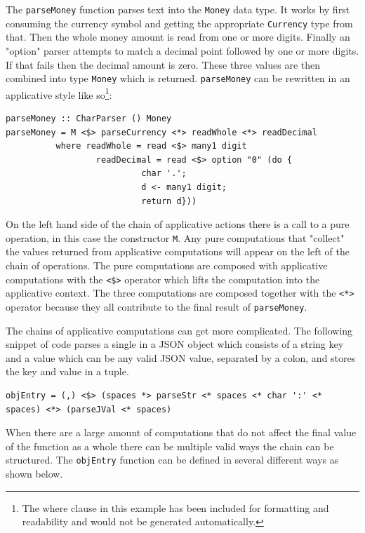 The \texttt{parseMoney} function parses text into the \texttt{Money} data type. It works by first consuming the currency symbol and getting the appropriate \texttt{Currency} type from that. Then the whole money amount is read from one or more digits. Finally an "option" parser attempts to match a decimal point followed by one or more digits. If that fails then the decimal amount is zero. These three values are then combined into type \texttt{Money} which is returned. \texttt{parseMoney} can be rewritten in an applicative style like so\footnote{The where clause in this example has been included for formatting and readability and would not be generated automatically.}:

\begin{lstlisting}[frame=tlrb]
parseMoney :: CharParser () Money
parseMoney = M <$> parseCurrency <*> readWhole <*> readDecimal
          where readWhole = read <$> many1 digit
                  readDecimal = read <$> option "0" (do { 
                           char '.';
                           d <- many1 digit;
                           return d}))
\end{lstlisting}

On the left hand side of the chain of applicative actions there is a call to a pure operation, in this case the constructor \texttt{M}. Any pure computations that "collect" the values returned from applicative computations will appear on the left of the chain of operations. The pure computations are composed with applicative computations with the \texttt{<\$>} operator which lifts the computation into the applicative context. The three computations are composed together with the \texttt{<*>} operator because they all contribute to the final result of \texttt{parseMoney}.

The chains of applicative computations can get more complicated. The following snippet of code parses a single in a JSON object which consists of a string key and a value which can be any valid JSON value, separated by a colon, and stores the key and value in a tuple. 

\begin{lstlisting}[frame=tblr]
objEntry = (,) <$> (spaces *> parseStr <* spaces <* char ':' <* spaces) <*> (parseJVal <* spaces)
\end{lstlisting}

When there are a large amount of computations that do not affect the final value of the function as a whole there can be multiple valid ways the chain can be structured. The \texttt{objEntry} function can be defined in several different ways as shown below.

